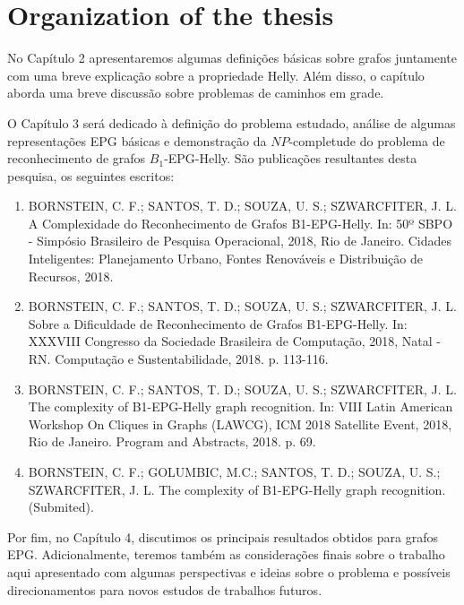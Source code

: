 





\section{Organization of the thesis}

No Capítulo 2 apresentaremos algumas definições básicas sobre grafos juntamente com uma breve explicação sobre a propriedade Helly. Além disso, o capítulo aborda uma breve discussão sobre problemas de caminhos em grade.

O Capítulo 3 será dedicado à definição do problema estudado, análise de algumas representações EPG básicas e demonstração da $NP$-completude do problema de reconhecimento de grafos $B_1$-EPG-Helly. São publicações resultantes desta pesquisa, os seguintes escritos:

\begin{enumerate}
    \item BORNSTEIN, C. F.; SANTOS, T. D.; SOUZA, U. S.; SZWARCFITER, J. L. A Complexidade do Reconhecimento de Grafos B1-EPG-Helly. In: 50º SBPO - Simpósio Brasileiro de Pesquisa Operacional, 2018, Rio de Janeiro. Cidades Inteligentes: Planejamento Urbano, Fontes Renováveis e Distribuição de Recursos, 2018.

     \item BORNSTEIN, C. F.; SANTOS, T. D.; SOUZA, U. S.; SZWARCFITER, J. L. Sobre a Dificuldade de Reconhecimento de Grafos B1-EPG-Helly. In: XXXVIII Congresso da Sociedade Brasileira de Computação, 2018, Natal - RN. Computação e Sustentabilidade, 2018. p. 113-116.

     
     \item BORNSTEIN, C. F.; SANTOS, T. D.; SOUZA, U. S.; SZWARCFITER, J. L. The complexity of B1-EPG-Helly graph recognition. In: VIII Latin American Workshop On Cliques in Graphs (LAWCG), ICM 2018 Satellite Event, 2018, Rio de Janeiro. Program and Abstracts, 2018. p. 69.

     
     \item BORNSTEIN, C. F.; GOLUMBIC, M.C.; SANTOS, T. D.; SOUZA, U. S.; SZWARCFITER, J. L.  The complexity of B1-EPG-Helly graph recognition. %
     (Submited).
     
\end{enumerate}


Por fim, no Capítulo 4, discutimos os principais resultados obtidos para grafos EPG. Adicionalmente, teremos
também as considerações finais sobre o trabalho aqui apresentado com algumas perspectivas e ideias sobre o problema e possíveis direcionamentos para novos estudos de trabalhos futuros.